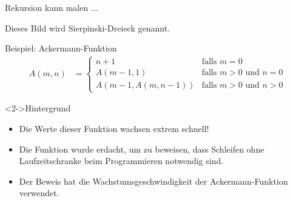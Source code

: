 \begin{frame}
    \begin{block}{Rekursion kann malen ...}
    \end{block}
    \begin{block}{Dieses Bild wird \alert{Sierpinski-Dreieck} genannt.}
    \end{block}
\end{frame}

\begin{frame}%
    \begin{block}{Beispiel: Ackermann-Funktion}
    \begin{align*}
        A(m,n) &= \begin{cases}
                      n+1 &\text{falls $m = 0$}\\
                      A(m-1,1) &\text{falls $m > 0$ und $n = 0$}\\
                      A(m-1,A(m,n-1)) &\text{falls $m > 0$ und $n > 0$}
                  \end{cases}
    \end{align*}
    \end{block}
    \begin{block}<2->{Hintergrund}
        \begin{itemize}
            \item Die Werte dieser Funktion wachsen extrem schnell!
            \item Die Funktion wurde erdacht, um zu beweisen,
                  dass Schleifen ohne Laufzeitschranke 
                  beim Programmieren notwendig sind.
            \item Der Beweis hat die Wachstumsgeschwindigkeit
                  der Ackermann-Funktion verwendet.
        \end{itemize}
    \end{block}
\end{frame}
